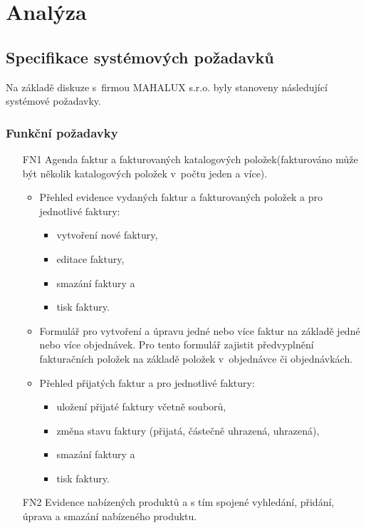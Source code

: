 \documentclass[thesis=B,czech]{FITthesis}[2012/06/26]
\begin{document}
\chapter{Analýza}

\section{Specifikace systémových požadavků}

	Na základě diskuze s~firmou MAHALUX s.r.o. byly stanoveny následující systémové požadavky.
	
\subsection{Funkční požadavky}

\begin{enumerate}
	\item[FN1] Agenda faktur a fakturovaných katalogových položek(fakturováno může být několik katalogových položek v~počtu jeden a více).
	\begin{itemize}
		\item Přehled evidence vydaných faktur a fakturovaných položek a pro jednotlivé faktury:
		\begin{itemize}
			\item vytvoření nové faktury,
			\item editace faktury,
			\item smazání faktury a
			\item tisk faktury.
		\end{itemize}
		\item Formulář pro vytvoření a úpravu jedné nebo více faktur na základě jedné nebo více objednávek. Pro tento formulář zajistit předvyplnění fakturačních položek na základě položek v~objednávce či objednávkách.
		\item Přehled přijatých faktur a pro jednotlivé faktury:
		\begin{itemize}
			\item uložení přijaté faktury včetně souborů,
			\item změna stavu faktury (přijatá, částečně uhrazená, uhrazená),
			\item smazání faktury a
			\item tisk faktury.
		\end{itemize}
	\end{itemize}	
	\item[FN2] Evidence nabízených produktů a s tím spojené
	 	vyhledání, přidání, úprava a smazání nabízeného produktu.

\end{enumerate}
\end{document}
